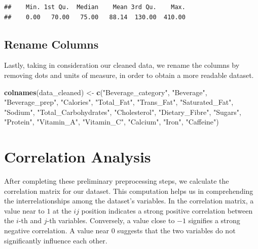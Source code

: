 \documentclass[
]{article}
\newenvironment{Shaded}{\begin{snugshade}}{\end{snugshade}}
\newcommand{\FunctionTok}[1]{\textcolor[rgb]{0.13,0.29,0.53}{\textbf{#1}}}
\newcommand{\NormalTok}[1]{#1}
\newcommand{\OtherTok}[1]{\textcolor[rgb]{0.56,0.35,0.01}{#1}}
\newcommand{\StringTok}[1]{\textcolor[rgb]{0.31,0.60,0.02}{#1}}
\begin{document}
\begin{verbatim}
##    Min. 1st Qu.  Median    Mean 3rd Qu.    Max. 
##    0.00   70.00   75.00   88.14  130.00  410.00
\end{verbatim}

\subsection{Rename Columns}\label{rename-columns}

Lastly, taking in consideration our cleaned data, we rename the columns
by removing dots and units of measure, in order to obtain a more
readable dataset.

\begin{Shaded}
\begin{Highlighting}[]
\FunctionTok{colnames}\NormalTok{(data\_cleaned) }\OtherTok{\textless{}{-}} \FunctionTok{c}\NormalTok{(}\StringTok{"Beverage\_category"}\NormalTok{, }\StringTok{"Beverage"}\NormalTok{,}
                            \StringTok{"Beverage\_prep"}\NormalTok{, }\StringTok{"Calories"}\NormalTok{,}
                            \StringTok{"Total\_Fat"}\NormalTok{, }\StringTok{"Trans\_Fat"}\NormalTok{,}
                            \StringTok{"Saturated\_Fat"}\NormalTok{, }\StringTok{"Sodium"}\NormalTok{,}
                            \StringTok{"Total\_Carbohydrates"}\NormalTok{, }\StringTok{"Cholesterol"}\NormalTok{,}
                            \StringTok{"Dietary\_Fibre"}\NormalTok{, }\StringTok{"Sugars"}\NormalTok{,}
                            \StringTok{"Protein"}\NormalTok{, }\StringTok{"Vitamin\_A"}\NormalTok{,}
                            \StringTok{"Vitamin\_C"}\NormalTok{, }\StringTok{"Calcium"}\NormalTok{,}
                            \StringTok{"Iron"}\NormalTok{, }\StringTok{"Caffeine"}\NormalTok{)}
\end{Highlighting}
\end{Shaded}

\section{Correlation Analysis}\label{correlation-analysis}

After completing these preliminary preprocessing steps, we calculate the
correlation matrix for our dataset. This computation helps us in
comprehending the interrelationships among the dataset's variables. In
the correlation matrix, a value near to \(1\) at the \(ij\) position
indicates a strong positive correlation between the \(i\)-th and
\(j\)-th variables. Conversely, a value close to \(-1\) signifies a
strong negative correlation. A value near \(0\) suggests that the two
variables do not significantly influence each other.
\end{document}
